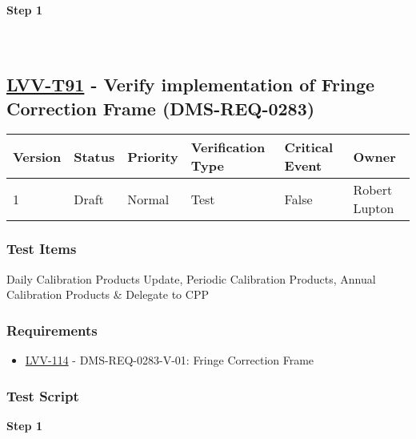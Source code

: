 \textbf{Step 1}\\
~\\
~\\

\hypertarget{lvv-t91---verify-implementation-of-fringe-correction-frame-dms-req-0283}{%
\subsection{\texorpdfstring{\href{https://jira.lsstcorp.org/secure/Tests.jspa\#/testCase/LVV-T91}{LVV-T91}
- Verify implementation of Fringe Correction Frame
(DMS-REQ-0283)}{LVV-T91 - Verify implementation of Fringe Correction Frame (DMS-REQ-0283)}}\label{lvv-t91---verify-implementation-of-fringe-correction-frame-dms-req-0283}}

\begin{longtable}[]{@{}llllll@{}}
\toprule
Version & Status & Priority & Verification Type & Critical Event &
Owner\tabularnewline
\midrule
\endhead
1 & Draft & Normal & Test & False & Robert Lupton\tabularnewline
\bottomrule
\end{longtable}

\hypertarget{test-items-67}{%
\subsubsection{Test Items}\label{test-items-67}}

Daily Calibration Products Update, Periodic Calibration Products, Annual
Calibration Products \& Delegate to CPP

\hypertarget{requirements-68}{%
\subsubsection{Requirements}\label{requirements-68}}

\begin{itemize}
\tightlist
\item
  \href{https://jira.lsstcorp.org/browse/LVV-114}{LVV-114} -
  DMS-REQ-0283-V-01: Fringe Correction Frame
\end{itemize}

\hypertarget{test-script-68}{%
\subsubsection{Test Script}\label{test-script-68}}

\textbf{Step 1}\\
~\\
~\\

